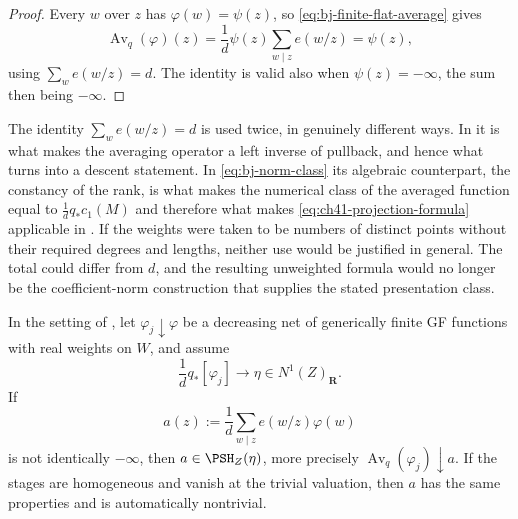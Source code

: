 \begin{proof}
Every $w$ over $z$ has $\varphi(w)=\psi(z)$, so
\eqref{eq:bj-finite-flat-average} gives
\[
 \operatorname{Av}_q(\varphi)(z)
 =\frac1d\psi(z)\sum_{w\mid z}e(w/z)
 =\psi(z),
\]
using $\sum_we(w/z)=d$.  The identity is valid also when
$\psi(z)=-\infty$, the sum then being $-\infty$.
\end{proof}

\begin{remark}[The two roles of $\sum_we(w/z)=d$]
\label{rem:ch41-two-roles-of-d}
The identity $\sum_we(w/z)=d$ is used twice, in genuinely different ways.
In  it is what makes the averaging operator
a left inverse of pullback, and hence what turns
 into a descent statement.  In
\eqref{eq:bj-norm-class} its algebraic counterpart, the constancy of the
rank, is what makes the numerical class of the averaged function equal to
$\frac1dq_*c_1(M)$ and therefore what makes
\eqref{eq:ch41-projection-formula} applicable in
.  If the weights were taken to be numbers of
distinct points without their required degrees and lengths, neither use
would be justified in general.  The total could differ from $d$, and
the resulting unweighted formula would no longer be the coefficient-norm
construction that supplies the stated presentation class.
\end{remark}

\begin{corollary}\label{cor:bj-coefficient-norm-limit}
In the setting of , let
$\varphi_j\downarrow\varphi$ be a decreasing net of generically
finite GF functions with real weights on $W$, and assume
\[
             \frac1dq_*[\varphi_j]\longrightarrow
             \eta\in N^1(Z)_{\mathbf R}.
\tag{41.33}\label{eq:bj-norm-limit-classes}
\]
If
\[
 a(z):=\frac1d\sum_{w\mid z}e(w/z)\varphi(w)
\tag{41.34}\label{eq:bj-norm-limit-function}
\]
is not identically $-\infty$, then $a\in\PSH_Z(\eta)$, more
precisely $\operatorname{Av}_q(\varphi_j)\downarrow a$.  If the stages are homogeneous
and vanish at the trivial valuation, then $a$ has the same properties
and is automatically nontrivial.
\end{corollary}


